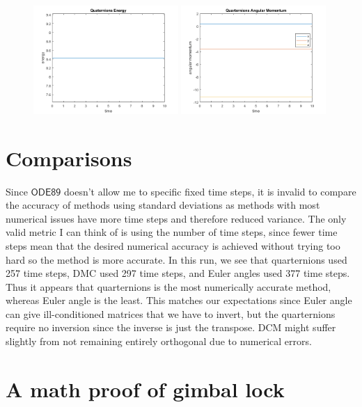 \documentclass[12pt]{article}
\begin{document}
\begin{figure}[H]
	\includegraphics[width=0.49\textwidth]{./figures/sim2.5.png}
	\includegraphics[width=0.49\textwidth]{./figures/sim2.6.png}
\end{figure}

\section{Comparisons}
Since $ \textsf{ODE89}$ doesn't allow me to specific fixed time steps, it is invalid to compare the accuracy of methods using standard deviations as methods with most numerical issues have more time steps and therefore reduced variance. The only valid metric I can think of is using the number of time steps, since fewer time steps mean that the desired numerical accuracy is achieved without trying too hard so the method is more accurate. In this run, we see that quarternions used 257 time steps, DMC used 297 time steps, and Euler angles used 377 time steps. Thus it appears that quarternions is the most numerically accurate method, whereas Euler angle is the least. This matches our expectations since Euler angle can give ill-conditioned matrices that we have to invert, but the quarternions require no inversion since the inverse is just the transpose. DCM might suffer slightly from not remaining entirely orthogonal due to numerical errors.
\section{A math proof of gimbal lock}
\end{document}
